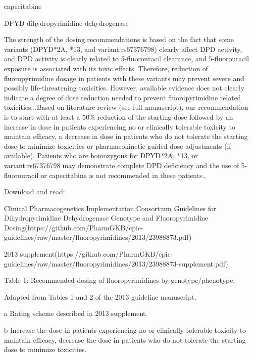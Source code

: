 \documentclass{resume} %
\begin{document}
\begin{rSection}{ capecitabine }
\begin{rSubsection}{ DPYD }{ dihydropyrimidine dehydrogenase }{}{}
\item The strength of the dosing recommendations is based on the fact that some variants (DPYD*2A, *13, and variant:rs67376798) clearly affect DPD activity, and DPD activity is clearly related to 5-fluorouracil clearance, and 5-fluorouracil exposure is associated with its toxic effects. Therefore, reduction of fluoropyrimidine dosage in patients with these variants may prevent severe and possibly life-threatening toxicities. However, available evidence does not clearly indicate a degree of dose reduction needed to prevent fluoropyrimidine related toxicities...Based on literature review (see full manuscript), our recommendation is to start with at least a 50\% reduction of the starting dose followed by an increase in dose in patients experiencing no or clinically tolerable toxicity to maintain efficacy, a decrease in dose in patients who do not tolerate the starting dose to minimize toxicities or pharmacokinetic guided dose adjustments (if available). Patients who are homozygous for DPYD*2A, *13, or variant:rs67376798 may demonstrate complete DPD deficiency and the use of 5-fluorouracil or capecitabine is not recommended in these patients.,  
 \newline
\item Download and read:
 \newline
\item Clinical Pharmacogenetics Implementation Consortium Guidelines for Dihydropyrimidine Dehydrogenase Genotype and Fluoropyrimidine Dosing(https://github.com/PharmGKB/cpic-guidelines/raw/master/fluoropyrimidines/2013/23988873.pdf)
 \newline
\item 2013 supplement(https://github.com/PharmGKB/cpic-guidelines/raw/master/fluoropyrimidines/2013/23988873-supplement.pdf)
 \newline
\item Table 1: Recommended dosing of fluoropyrimidines by genotype/phenotype.
 \newline
\item Adapted from Tables 1 and 2 of the 2013 guideline manuscript.
 \newline
\item a Rating scheme described in 2013 supplement.
 \newline
\item b Increase the dose in patients experiencing no or clinically tolerable toxicity to maintain efficacy,  decrease the dose in patients who do not tolerate the starting dose to minimize toxicities.

\end{rSubsection}
\end{rSection}
\end{document}
